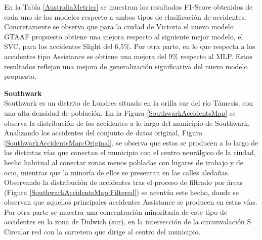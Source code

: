 \documentclass{uathesis-es}
\begin{document}
{	En la Tabla \ref{AustraliaMetrics} se muestran los resultados F1-Score obtenidos de cada uno de los modelos respecto a ambos tipos de clasificación de accidentes. Concretamente se observa que para la ciudad de Victoria el nuevo modelo GTAAF propuesto obtiene una mejora respecto al siguiente mejor modelo, el SVC, para los accidentes Slight del 6,5\%. Por otra parte, en lo que respecta a los accidentes tipo Assistance se obtiene una mejora del 9\% respecto al MLP. Estos resultados reflejan una mejora de generalización significativa del nuevo modelo propuesto.
	
	
	
	\textbf{Southwark}\\
	
	Southwark es un distrito de Londres situado en la orilla sur del río Támesis, con una alta densidad de población. En la Figura \ref{SouthwarkAccidentsMap} se observa la distribución de los accidentes a lo largo del municipio de Southwark. Analizando los accidentes del conjunto de datos original, Figura \ref{SouthwarkAccidentsMap:Original}, se observa que estos se producen a lo largo de las distintas vías que conectan el municipio con el centro neurálgico de la ciudad, hecho habitual al conectar zonas menos pobladas con lugares de trabajo y de ocio, mientras que la minoría de ellos se presentan en las calles aledañas. Observando la distribución de accidentes tras el proceso de filtrado por áreas (Figura \ref{SouthwarkAccidentsMap:Filtered}) se acentúa este hecho, donde se observan que aquellos principales accidentes Assistance se producen en estas vías. Por otra parte se muestra una concentración minoritaria de este tipo de accidentes en la zona de Dulwich (sur), en la intersección de la circunvalación S Circular red con la carretera que dirige al centro del municipio.
	
	
	
}
\end{document}

